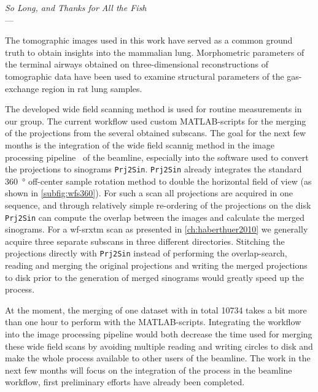 \acresetall
{}\label{ch:outlook}
\begin{flushright}{\slshape    
		So Long, and Thanks for All the Fish} \\ \medskip
    ---  \citep{Adams1984}
\end{flushright}

\vfill

The tomographic images used in this work have served as a common ground truth to obtain insights into the mammalian lung. Morphometric parameters of the terminal airways obtained on three-dimensional reconstructions of tomographic data have been used to examine structural parameters of the gas-exchange region in rat lung samples.

The developed wide field scanning method is used for routine measurements in our group. The current workflow used custom MATLAB-scripts for the merging of the projections from the several obtained subscans. The goal for the next few months is the integration of the wide field scannig method in the image processing pipeline~\cite{Hintermueller2010} of the  beamline, especially into the software used to convert the projections to sinograms \verb+Prj2Sin+. \verb+Prj2Sin+ already integrates the standard \SI{360}{\degree} off-center sample rotation method to double the horizontal field of view (as shown in \autoref{subfig:wfs360}). For such a scan all projections are acquired in one sequence, and through relatively simple re-ordering of the projections on the disk \verb+Prj2Sin+ can compute the overlap between the images and calculate the merged sinograms. For a \ac{wf-srxtm} scan as presented in \autoref{ch:haberthuer2010} we generally acquire three separate subscans in three different directories. Stitching the projections directly with \verb+Prj2Sin+ instead of performing the overlap-search, reading and merging the original projections and writing the merged projections to disk prior to the generation of merged sinograms would greatly speed up the process.

At the moment, the merging of one dataset with in total \num{10734} takes a bit more than one hour to perform with the MATLAB-scripts. Integrating the workflow into the image processing pipeline would both decrease the time used for merging these wide field scans by avoiding multiple reading and writing circles to disk and make the whole process available to other users of the beamline. The work in the next few months will focus on the integration of the process in the beamline workflow, first preliminary efforts have already been completed.

